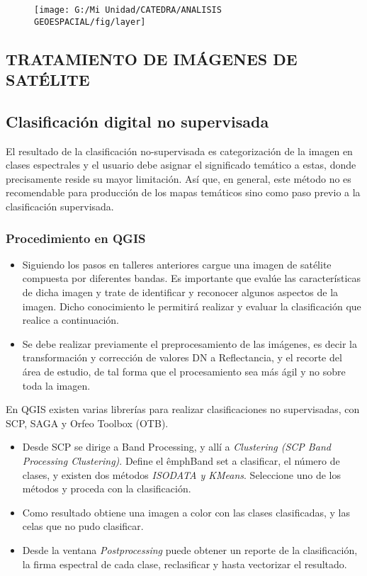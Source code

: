 \documentclass[a4paper,oneside,11pt,]{article}
\begin{document}
\begin{figure}
\centering
\texttt{[image: G:/Mi Unidad/CATEDRA/ANALISIS GEOESPACIAL/fig/layer]}
\end{figure}

\subsection{TRATAMIENTO DE IMÁGENES DE SATÉLITE}

\subsection{Clasificación digital no supervisada}
El resultado de la clasificación no-supervisada es categorización de la imagen en clases espectrales y el usuario debe asignar el significado temático a estas, donde precisamente reside su mayor limitación. Así que, en general, este método no es recomendable para producción de los mapas temáticos sino como paso previo a la clasificación supervisada.

\subsubsection{Procedimiento en QGIS}
\begin{itemize}
\item Siguiendo los pasos en talleres anteriores cargue una imagen de satélite compuesta por diferentes bandas. Es importante que evalúe las características de dicha imagen y trate de identificar y reconocer algunos aspectos de la imagen. Dicho conocimiento le permitirá realizar y evaluar la clasificación que realice a continuación.
\item Se debe realizar previamente el preprocesamiento de las imágenes, es decir la transformación y corrección de valores DN a Reflectancia, y el recorte del área de estudio, de tal forma que el procesamiento sea más ágil y no sobre toda la imagen.
\end{itemize}

En QGIS existen varias librerías para realizar clasificaciones no supervisadas, con SCP, SAGA y Orfeo Toolbox (OTB).

\begin{itemize}
\item Desde SCP se dirige a Band Processing, y allí a \emph{Clustering (SCP Band Processing Clustering)}. Define el êmph{Band set} a clasificar, el número de clases, y existen dos métodos \emph{ISODATA y KMeans}. Seleccione uno de los métodos y proceda con la clasificación.
\item Como resultado obtiene una imagen a color con las clases clasificadas, y las celas que no pudo clasificar. 
\item Desde la ventana \emph{Postprocessing} puede obtener un reporte de la clasificación, la firma espectral de cada clase, reclasificar y hasta vectorizar el resultado.
\end{itemize}
\end{document}
